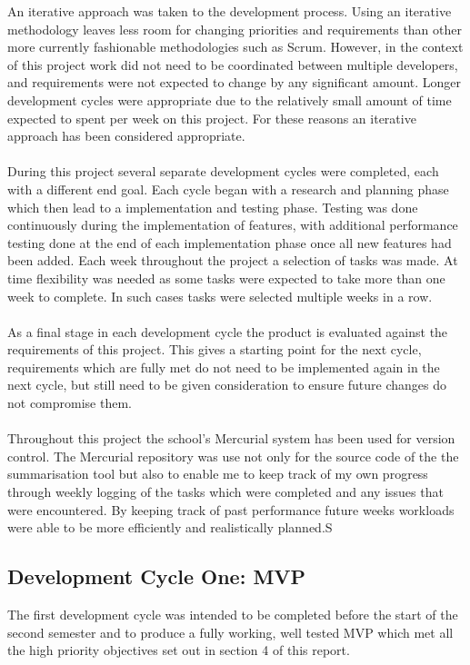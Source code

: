 An iterative approach was taken to the development process. Using an iterative methodology leaves less room for changing priorities and requirements than other more currently fashionable methodologies such as Scrum. However, in the context of this project work did not need to be coordinated between multiple developers, and requirements were not expected to change by any significant amount. Longer development cycles were appropriate due to the relatively small amount of time expected to spent per week on this project. For these reasons an iterative approach has been considered appropriate.\\\\
During this project several separate development cycles were completed, each with a different end goal. Each cycle began with a research and planning phase which then lead to a implementation and testing phase. Testing was done continuously during the implementation of features, with additional performance testing done at the end of each implementation phase once all new features had been added.
Each week throughout the project a selection of tasks was made. At time flexibility was needed as some tasks were expected to take more than one week to complete. In such cases tasks were selected multiple weeks in a row.\\\\
As a final stage in each development cycle the product is evaluated against the requirements of this project. This gives a starting point for the next cycle, requirements which are fully met do not need to be implemented again in the next cycle, but still need to be given consideration to ensure future changes do not compromise them. \\\\
Throughout this project the school's Mercurial system has been used for version control. The Mercurial repository was use not only for the source code of the the summarisation tool but also to enable me to keep track of my own progress through weekly logging of the tasks which were completed and any issues that were encountered. By keeping track of past performance future weeks workloads were able to be more efficiently and realistically planned.S
\subsection{Development Cycle One: MVP}
The first development cycle was intended to be completed before the start of the second semester and to produce a fully working, well tested MVP which met all the high priority objectives set out in section 4 of this report.  
